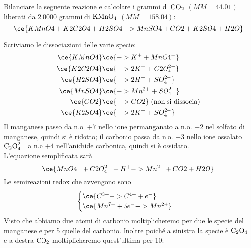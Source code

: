\begin{esercizio}
    Bilanciare la seguente reazione e calcolare i grammi di $\rm CO_2$ $(MM=44.01)$ liberati da 2.0000 grammi di $\rm KMnO_4$ $(MM=158.04)$:
    \begin{equation*}
        \ce{KMnO4 + K2C2O4 + H2SO4 -> MnSO4 + CO2 + K2SO4 + H2O}
    \end{equation*}
\end{esercizio}
\begin{soluzione}
    Scriviamo le dissociazioni delle varie specie:
    \begin{equation*}
        \begin{split}
            \ce{KMnO4} & \ce{-> K^+ + MnO4^-}
            \\
            \ce{K2C2O4} & \ce{-> 2K^+ + C2O_4^{2-}}
            \\
            \ce{H2SO4} & \ce{-> 2H^+ + SO_4^{2-}}
            \\
            \ce{MnSO4} & \ce{-> Mn^{2+} + SO_4^{2-}}
            \\
            \ce{CO2} & \ce{-> CO2}\;\text{(non si dissocia)}
            \\
            \ce{K2SO4} & \ce{-> 2K^+ + SO_4^{2-}}
        \end{split}
    \end{equation*}
    Il manganese passo da n.o. $+7$ nello ione permanganato a n.o. $+2$ nel solfato di manganese, quindi si è ridotto; il carbonio passa da n.o. $+3$ nello ione ossalato $\rm C_2O_4^{2-}$ a n.o $+4$ nell'anidride carbonica, quindi si è ossidato.\\
    L'equazione semplificata sarà
    \begin{equation*}
        \ce{MnO4^- + C2O_4^{2-} + H^+ -> Mn^{2+} + CO2 + H2O}
    \end{equation*}
    Le semireazioni redox che avvengono sono
    \begin{equation*}
        \begin{cases}
            \ce{C^{3+} -> C^{4+} + e^-}
            \\
            \ce{Mn^{7+} + 5e^- -> Mn^{2+}}
        \end{cases}
    \end{equation*}
    Visto che abbiamo due atomi di carbonio moltiplicheremo per due le specie del manganese e per 5 quelle del carbonio. Inoltre poiché a sinistra la specie è $\rm C_2O_4$ e a destra $\rm CO_2$ moltiplicheremo quest'ultima per 10:
    \begin{equation*}

\end{equation*}
\end{soluzione}
